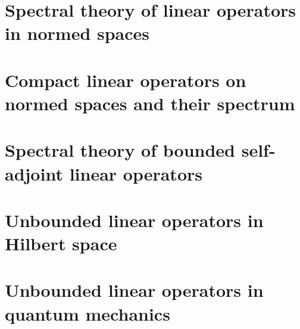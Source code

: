 \documentclass{bookSolutions}
\begin{document}
\chapter{Spectral theory of linear operators in normed spaces}


\chapter{Compact linear operators on normed spaces and their spectrum}


\chapter{Spectral theory of bounded self-adjoint linear operators}


\chapter{Unbounded linear operators in Hilbert space}


\chapter{Unbounded linear operators in quantum mechanics}

\end{document}
